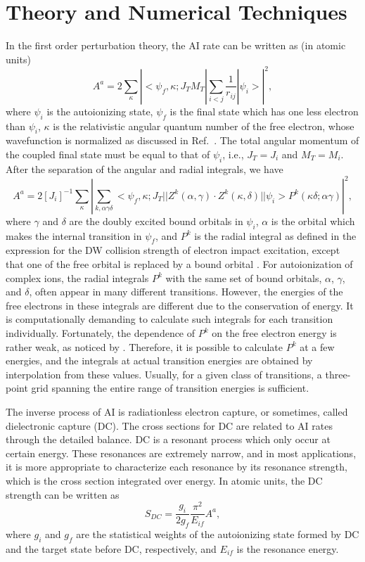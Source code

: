 \documentclass[preprint, floatfix, pra, showpacs, showkeys]{revtex4}
\begin{document}
\section{Theory and Numerical Techniques}
\label{sec_theory}
In the first order perturbation theory, the AI rate can be written as (in
atomic units) 
\begin{equation}
A^a = 2\sum_\kappa \left|
<\psi_f,\kappa;J_TM_T|\sum_{i<j}\frac{1}{r_{ij}}|\psi_i>\right|^2,
\end{equation}
where $\psi_i$ is the autoionizing state, $\psi_f$ is the final state which has
one less electron than $\psi_i$, $\kappa$ is the relativistic angular quantum
number of the free electron, whose wavefunction is normalized as discussed in
Ref.~\cite{gu02b}. The total angular momentum of the coupled final state must
be equal to that of $\psi_i$, i.e.,  $J_T = J_i$ and $M_T = M_i$. After the
separation of the angular and radial integrals, we have
\begin{equation}
A^a = 2[J_i]^{-1}\sum_\kappa \left|\sum_{k,\alpha\gamma\delta}
<\psi_f,\kappa;J_T||Z^k(\alpha,\gamma)
\cdot Z^k(\kappa,\delta)||\psi_i>P^k(\kappa\delta;\alpha\gamma)\right|^2,
\end{equation}
where $\gamma$ and $\delta$ are the doubly excited bound orbitals in
$\psi_i$, $\alpha$ is the orbital which makes the internal transition in
$\psi_f$, and
$P^k$ is the radial integral as defined in the expression for the DW collision
strength of electron impact excitation, except that one of the free orbital
is replaced by a bound orbital \cite{gu02b}. For autoionization of
complex ions, the radial integrals $P^k$ with the same set of bound orbitals,
$\alpha$, $\gamma$, and $\delta$, 
often appear in many different transitions. However, the energies of the free
electrons in these integrals are different due to the conservation of
energy. It is 
computationally demanding to calculate such integrals for each transition
individually. Fortunately, the dependence of $P^k$ on the free electron energy
is rather weak, as noticed by \textcite{oreg91}. Therefore, it is possible to
calculate $P^k$ at a few energies, and the integrals at actual transition
energies are obtained by interpolation from these values. Usually, for a given
class of 
transitions, a three-point grid spanning the entire range of transition
energies is sufficient.

The inverse process of AI is radiationless electron capture, or sometimes,
called dielectronic capture (DC). The cross sections for DC are related to AI
rates through the detailed balance. DC is a resonant process which only occur
at certain energy. These resonances are extremely narrow, and in most
applications, it is more appropriate to characterize each resonance by its
resonance strength, which is the cross section integrated over energy. In
atomic units, the DC strength can be written as
\begin{equation}
S_{DC} = \frac{g_i}{2g_f}\frac{\pi^2}{E_{if}}A^a,
\end{equation}
where $g_i$ and $g_f$ are the statistical weights of the autoionizing state
formed by DC and the target state before DC, respectively, and $E_{if}$ is the
resonance energy. 
\end{document}

